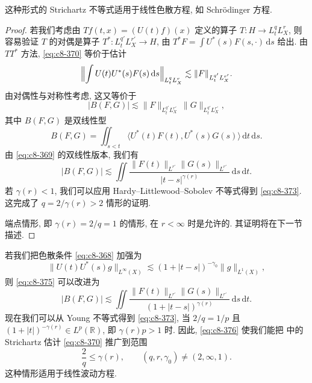 \begin{remark}\label{rem:c8-0.51}
这种形式的 Strichartz 不等式适用于线性色散方程, 如 Schrödinger 方程. 
\end{remark}

\begin{proof}
若我们考虑由 $Tf(t, x)=(U(t)f)(x)$ 定义的算子 $T:H\to L_t^q L_X^r$, 则容易验证 $T$ 的对偶是算子 $T^{*}:L_t^{q'} L_X^{r'}\to H$, 由 $T^{*}F=\int U^{*}(s)F(s, \cdot)\, \mathrm{d}s$ 给出. 由 $TT^{*}$ 方法, \eqref{eq:c8-370} 等价于估计
\begin{equation}
\Bigl\|\int U(t)U^{*}(s)F(s)\, \mathrm{d}s\Bigr\|_{L_t^q L_X^r}\lesssim\|F\|_{L_t^{q'} L_X^{r'}}.\label{eq:c8-372}
\end{equation}
由对偶性与对称性考虑, 这又等价于
\begin{equation}
|B(F, G)|\lesssim\|F\|_{L_t^{q'} L_X^{r'}}\, \|G\|_{L_t^{q'} L_X^{r'}}, \label{eq:c8-373}
\end{equation}
其中 $B(F, G)$ 是双线性型
\begin{equation}
B(F, G)=\iint_{s<t}\bigl\langle U^{*}(t)F(t), U^{*}(s)G(s)\bigr\rangle\, \mathrm{d}t\, \mathrm{d}s.\label{eq:c8-374}
\end{equation}
由 \eqref{eq:c8-369} 的双线性版本, 我们有
\begin{equation}
|B(F, G)|\lesssim\iint\frac{\|F(t)\|_{L^{r'}}\|G(s)\|_{L^{r'}}}{|t-s|^{\gamma(r)}}\, \mathrm{d}s\, \mathrm{d}t.\label{eq:c8-375}
\end{equation}
若 $\gamma(r)<1$, 我们可以应用 Hardy--Littlewood--Sobolev 不等式得到 \eqref{eq:c8-373}. 这完成了 $q=2/\gamma(r)>2$ 情形的证明. 

端点情形, 即 $\gamma(r)=2/q=1$ 的情形, 在 $r<\infty$ 时是允许的. 其证明将在下一节描述. 
\end{proof}

\begin{remark}\label{rem:c8-0.52}
若我们把色散条件 \eqref{eq:c8-368} 加强为
\begin{equation}
\bigl\|U(t)U^{*}(s)g\bigr\|_{L^\infty(X)}\lesssim(1+|t-s|)^{-\gamma_0}\|g\|_{L^1(X)}, \label{eq:c8-376}
\end{equation}
则 \eqref{eq:c8-375} 可以改进为
\begin{equation}
|B(F, G)|\lesssim\iint\frac{\|F(t)\|_{L^{r'}}\|G(s)\|_{L^{r'}}}{(1+|t-s|)^{\gamma(r)}}\, \mathrm{d}s\, \mathrm{d}t.\label{eq:c8-377}
\end{equation}
现在我们可以从 Young 不等式得到 \eqref{eq:c8-373}, 当 $2/q=1/p$ 且 $(1+|t|)^{-\gamma(r)}\in L^p(\mathbb{R})$, 即 $\gamma(r)p>1$ 时. 因此, \eqref{eq:c8-376} 使我们能把 中的 Strichartz 估计 \eqref{eq:c8-370} 推广到范围
\begin{equation}
\frac{2}{q}\leq\gamma(r), \qquad (q, r, \gamma_0)\neq(2, \infty, 1).\label{eq:c8-378}
\end{equation}
这种情形适用于线性波动方程. 
\end{remark}

